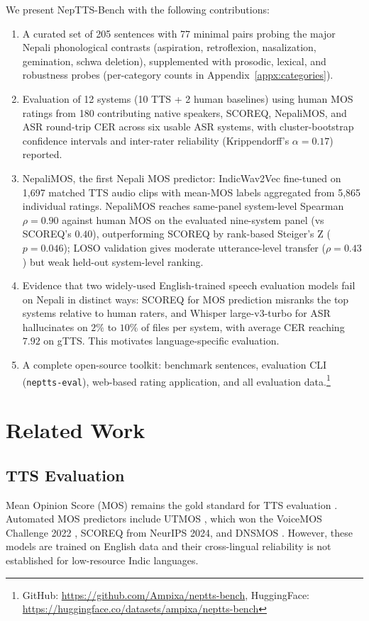 \documentclass[11pt]{article}
\begin{document}
We present NepTTS-Bench with the following contributions:

\begin{enumerate}
\item A curated set of 205 sentences with 77 minimal pairs probing the major Nepali phonological contrasts (aspiration, retroflexion, nasalization, gemination, schwa deletion), supplemented with prosodic, lexical, and robustness probes (per-category counts in Appendix~\ref{appx:categories}).
\item Evaluation of 12 systems (10 TTS + 2 human baselines) using human MOS ratings from 180 contributing native speakers, SCOREQ, NepaliMOS, and ASR round-trip CER across six usable ASR systems, with cluster-bootstrap confidence intervals and inter-rater reliability (Krippendorff's $\alpha = 0.17$) reported.
\item NepaliMOS, the first Nepali MOS predictor: IndicWav2Vec fine-tuned on 1{,}697 matched TTS audio clips with mean-MOS labels aggregated from 5{,}865 individual ratings. NepaliMOS reaches same-panel system-level Spearman $\rho = 0.90$ against human MOS on the evaluated nine-system panel (vs SCOREQ's $0.40$), outperforming SCOREQ by rank-based Steiger's Z ($p = 0.046$); LOSO validation gives moderate utterance-level transfer ($\rho = 0.43$) but weak held-out system-level ranking.
\item Evidence that two widely-used English-trained speech evaluation models fail on Nepali in distinct ways: SCOREQ for MOS prediction misranks the top systems relative to human raters, and Whisper large-v3-turbo for ASR hallucinates on $2\%$ to $10\%$ of files per system, with average CER reaching $7.92$ on gTTS. This motivates language-specific evaluation.
\item A complete open-source toolkit: benchmark sentences, evaluation CLI (\texttt{neptts-eval}), web-based rating application, and all evaluation data.\footnote{GitHub: \url{https://github.com/Ampixa/neptts-bench}, HuggingFace: \url{https://huggingface.co/datasets/ampixa/neptts-bench}}
\end{enumerate}


\section{Related Work}

\subsection{TTS Evaluation}
Mean Opinion Score (MOS) remains the gold standard for TTS evaluation \citep{streijl2016mos}. Automated MOS predictors include UTMOS \citep{saeki2022utmos}, which won the VoiceMOS Challenge 2022 \citep{huang2022voicemos}, SCOREQ \citep{ragano2024scoreq} from NeurIPS 2024, and DNSMOS \citep{reddy2022dnsmos}. However, these models are trained on English data and their cross-lingual reliability is not established for low-resource Indic languages.
\end{document}
